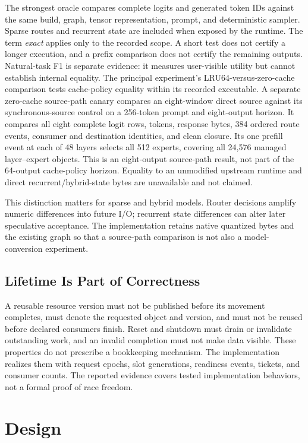 \documentclass[letterpaper,twocolumn,10pt]{article}
\begin{document}
The strongest oracle compares complete logits and generated token IDs against
the same build, graph, tensor representation, prompt, and deterministic
sampler.  Sparse routes and recurrent state are included when exposed by the
runtime.  The term \emph{exact} applies only to the recorded scope.  A short test
does not certify a longer execution, and a prefix comparison does not certify
the remaining outputs.  Natural-task F1 is separate evidence: it measures
user-visible utility but cannot establish internal equality.  The principal
experiment's LRU64-versus-zero-cache comparison tests cache-policy equality
within its recorded executable.  A separate zero-cache source-path canary compares
an eight-window direct source against its synchronous-source control on a
256-token prompt and eight-output horizon.  It compares all eight complete
logit rows, tokens, response bytes, 384 ordered route events, consumer and
destination identities, and clean closure.  Its one prefill event at each of
48 layers selects all 512 experts, covering all 24,576 managed layer--expert
objects.  This is an eight-output source-path result, not part of the 64-output
cache-policy horizon.  Equality to an unmodified upstream runtime and direct
recurrent/hybrid-state bytes are unavailable and not claimed.

This distinction matters for sparse and hybrid models.  Router decisions
amplify numeric differences into future I/O; recurrent state differences can
alter later speculative acceptance.  The implementation retains native quantized bytes and
the existing graph so that a source-path comparison is not also a model-
conversion experiment.

\subsection{Lifetime Is Part of Correctness}

A reusable resource version must not be published before its movement
completes, must denote the requested object and version, and must not be reused
before declared consumers finish.  Reset and shutdown must drain or invalidate
outstanding work, and an invalid completion must not make data visible.  These
properties do not prescribe a bookkeeping mechanism.  The implementation realizes them
with request epochs, slot generations, readiness events, tickets, and consumer
counts.  The reported evidence covers tested implementation behaviors, not a
formal proof of race freedom.

\section{Design}
\label{sec:design}
\end{document}
